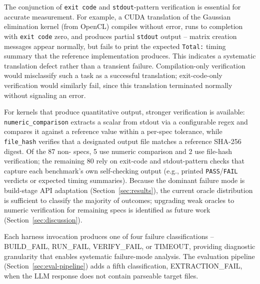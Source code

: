The conjunction of \texttt{exit code} and \texttt{stdout}-pattern verification is essential for accurate measurement. For example, a CUDA translation of the Gaussian elimination kernel (from OpenCL) compiles without error, runs to completion with \texttt{exit code} zero, and produces partial \texttt{stdout} output -- matrix creation messages appear normally, but fails to print the expected \texttt{Total:} timing summary that the reference implementation produces. This indicates a systematic translation defect rather than a transient failure. Compilation-only verification~\cite{CodeRosetta2024} would misclassify such a task as a successful translation; exit-code-only verification would similarly fail, since this translation terminated normally without signaling an error.

For kernels that produce quantitative output, stronger verification is available: \texttt{numeric\_comparison} extracts a scalar from stdout via a configurable regex and compares it against a reference value within a per-spec tolerance, while \texttt{file\_hash} verifies that a designated output file matches a reference SHA-256 digest. Of the 87 non-\knownfail{} specs, 5 use numeric comparison and 2 use file-hash verification; the remaining 80 rely on exit-code and stdout-pattern checks that capture each benchmark's own self-checking output (e.g., printed \texttt{PASS}/\texttt{FAIL} verdicts or expected timing summaries). Because the dominant failure mode is build-stage API adaptation (Section~\ref{sec:results}), the current oracle distribution is sufficient to classify the majority of outcomes; upgrading weak oracles to numeric verification for remaining specs is identified as future work (Section~\ref{sec:discussion}).

Each harness invocation produces one of four failure classifications -- BUILD\_FAIL, RUN\_FAIL, VERIFY\_FAIL, or TIMEOUT, providing diagnostic granularity that enables systematic failure-mode analysis. The evaluation pipeline (Section~\ref{sec:eval-pipeline}) adds a fifth classification, EXTRACTION\_FAIL, when the LLM response does not contain parseable target files. %

